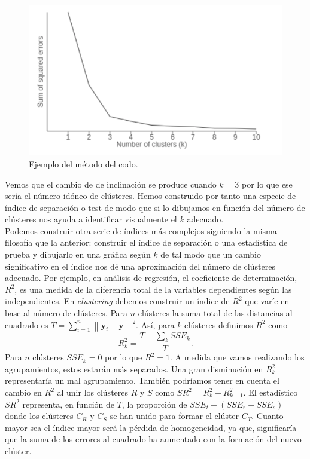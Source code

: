 \documentclass[a4paper, 20pt]{article}
\newcommand{\norm}[1]{\left\lVert#1\right\rVert}
\newcommand{\yy}{\textbf{y}}
\begin{document}
\begin{figure}[h]
	\centering
	\includegraphics[scale=0.6]{pedro/elbowGraph}
	\caption{Ejemplo del método del codo.}
	\label{fig:elbow}
\end{figure}

Vemos que el cambio de de inclinación se produce cuando $ k=3 $ por lo que ese sería el número idóneo de clústeres. Hemos construido por tanto una especie de índice de separación o test de modo que si lo dibujamos en función del número de clústeres nos ayuda a identificar visualmente el $ k $ adecuado. \\

Podemos construir otra serie de índices más complejos siguiendo la misma filosofía que la anterior: construir el índice de separación o una estadística de prueba y dibujarlo en una gráfica según $ k $ de tal modo que un cambio significativo en el índice nos dé una aproximación del número de clústeres adecuado. Por ejemplo, en análisis de regresión, el coeficiente de determinación, $ R^2 $, es una medida de la diferencia total de la variables dependientes según las independientes. En \textit{clustering} debemos construir un índice de $ R^2 $ que varíe en base al número de clústeres. Para $ n $ clústeres la suma total de las distancias al cuadrado es $ T = \sum_{i = 1}^{n} \norm{\yy_i - \bar{\yy}}^2 $. Así, para $ k $ clústeres definimos $ R^2 $ como
\[
R^{2}_{k} = \frac{T - \sum_k SSE_k}{T}.
\]
Para $ n $ clústeres $ SSE_k = 0 $ por lo que $ R^2 = 1 $. A medida que vamos realizando los agrupamientos, estos estarán más separados. Una gran disminución en $ R^2_k $ representaría un mal agrupamiento. También podríamos tener en cuenta el cambio en $ R^2 $ al unir los clústeres $ R $ y $ S $ como $ SR^2 = R_k^2 - R^2_{k-1} $. El estadístico $ SR^2 $ representa, en función de $ T $, la proporción de $ SSE_t - (SSE_r + SSE_s) $ donde los clústeres $ C_R $ y $ C_S $ se han unido para formar el clúster $ C_T $.  Cuanto mayor sea el índice mayor será la pérdida de homogeneidad, ya que, significaría que la suma de los errores al cuadrado ha aumentado con la formación del nuevo clúster.\\
\end{document}
